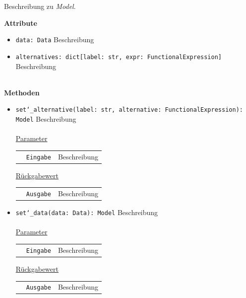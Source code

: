 \documentclass{article}
\begin{document}
Beschreibung zu \textit{Model}.
\newline \newline

\textbf{{Attribute}}
\begin{itemize}
\item \texttt{data: Data} \newline Beschreibung
\item \texttt{alternatives: dict[label: str, expr: FunctionalExpression]} \newline Beschreibung
\\\\
\end{itemize}

\textbf{{Methoden}}
\begin{itemize}
\item \texttt{set\char`_alternative(label: str, alternative: FunctionalExpression): Model} \newline Beschreibung
\\\\
\underline{{Parameter}}

\begin{tabular}{lll}
 & \texttt{Eingabe} & Beschreibung \\
\end{tabular}

\underline{{Rückgabewert}}

\begin{tabular}{lll}
 & \texttt{Ausgabe} & Beschreibung \\
\end{tabular}

\item \texttt{set\char`_data(data: Data): Model} \newline Beschreibung
\\\\
\underline{{Parameter}}

\begin{tabular}{lll}
 & \texttt{Eingabe} & Beschreibung \\
\end{tabular}

\underline{{Rückgabewert}}

\begin{tabular}{lll}
 & \texttt{Ausgabe} & Beschreibung \\
\end{tabular}
\end{itemize}
\end{document}
